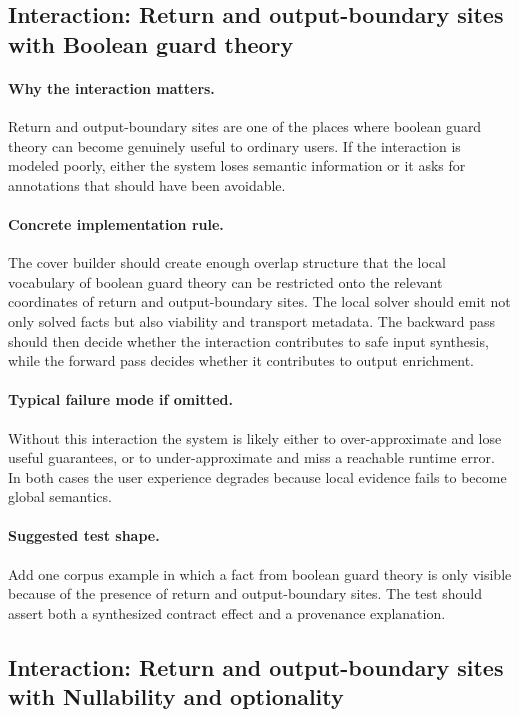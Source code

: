 \documentclass[11pt]{report}
\theoremstyle{definition}
\theoremstyle{plain}
\begin{document}
\subsection{Interaction: Return and output-boundary sites with Boolean guard theory}

\paragraph{Why the interaction matters.}
Return and output-boundary sites are one of the places where boolean guard theory can become
genuinely useful to ordinary users. If the interaction is modeled poorly,
either the system loses semantic information or it asks for annotations that
should have been avoidable.

\paragraph{Concrete implementation rule.}
The cover builder should create enough overlap structure that the local
vocabulary of boolean guard theory can be restricted onto the relevant
coordinates of return and output-boundary sites. The local solver should emit not only
solved facts but also viability and transport metadata. The backward pass
should then decide whether the interaction contributes to safe input
synthesis, while the forward pass decides whether it contributes to output
enrichment.

\paragraph{Typical failure mode if omitted.}
Without this interaction the system is likely either to over-approximate and
lose useful guarantees, or to under-approximate and miss a reachable runtime
error. In both cases the user experience degrades because local evidence
fails to become global semantics.

\paragraph{Suggested test shape.}
Add one corpus example in which a fact from boolean guard theory is only
visible because of the presence of return and output-boundary sites. The test should
assert both a synthesized contract effect and a provenance explanation.

\subsection{Interaction: Return and output-boundary sites with Nullability and optionality}
\end{document}

